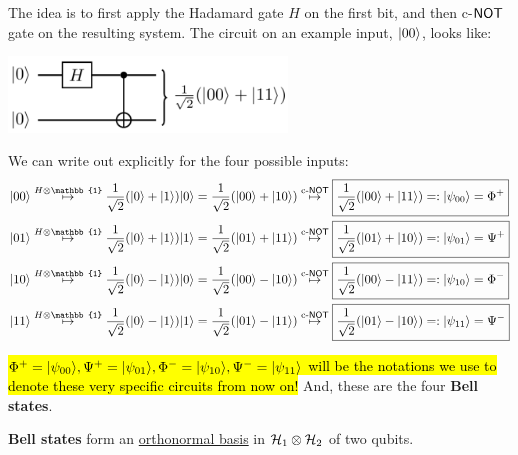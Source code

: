 \documentclass[12pt]{article}
\begin{document}
\begin{definition}
The idea is to first apply the Hadamard gate $H$ on the first bit, and then c-$\NOT$ gate on the resulting system. The circuit on an example input, $\Ket{00}$, looks like:
\begin{center}
\includegraphics[width = 20em]{images/4.jpg}
\end{center}

\noindent We can write out explicitly for the four possible inputs:$$
\begin{aligned}
\Ket{00} &\overset{H\otimes \mathbb{1}}{\mapsto} \frac{1}{\sqrt{2}}(\Ket{0} + \Ket{1})\Ket{0} = \frac{1}{\sqrt{2}}(\Ket{00} + \Ket{10})\overset{\text{c-}\NOT}{\mapsto}\boxed{\frac{1}{\sqrt{2}}(\Ket{00} + \Ket{11}) =: \Ket{\psi_{00}} = \Phi^+}\\
\Ket{01} &\overset{H\otimes \mathbb{1}}{\mapsto} \frac{1}{\sqrt{2}}(\Ket{0} + \Ket{1})\Ket{1} = \frac{1}{\sqrt{2}}(\Ket{01} + \Ket{11})\overset{\text{c-}\NOT}{\mapsto}\boxed{\frac{1}{\sqrt{2}}(\Ket{01} + \Ket{10}) =: \Ket{\psi_{01}} = \Psi^+}\\
\Ket{10} &\overset{H\otimes \mathbb{1}}{\mapsto} \frac{1}{\sqrt{2}}(\Ket{0} - \Ket{1})\Ket{0} = \frac{1}{\sqrt{2}}(\Ket{00} - \Ket{10})\overset{\text{c-}\NOT}{\mapsto}\boxed{\frac{1}{\sqrt{2}}(\Ket{00} - \Ket{11}) =: \Ket{\psi_{10}} = \Phi^-}\\
\Ket{11} &\overset{H\otimes \mathbb{1}}{\mapsto} \frac{1}{\sqrt{2}}(\Ket{0} - \Ket{1})\Ket{1} = \frac{1}{\sqrt{2}}(\Ket{01} - \Ket{11})\overset{\text{c-}\NOT}{\mapsto}\boxed{\frac{1}{\sqrt{2}}(\Ket{01} - \Ket{10}) =: \Ket{\psi_{11}} = \Psi^-}
\end{aligned}
$$
\end{definition}

\begin{definition}
\hl{$\Phi^+ = \Ket{\psi_{00}}, \Psi^+ = \Ket{\psi_{01}}, \Phi^- = \Ket{\psi_{10}}, \Psi^- = \Ket{\psi_{11}}$ will be the notations we use to denote these very specific circuits from now on!} And, these are the four \textbf{Bell states}.
\end{definition}

\begin{proposition}
\textbf{Bell states} form an \underline{orthonormal basis} in $\HHH_1\otimes \HHH_2$ of two qubits.
\end{proposition}
\end{document}
